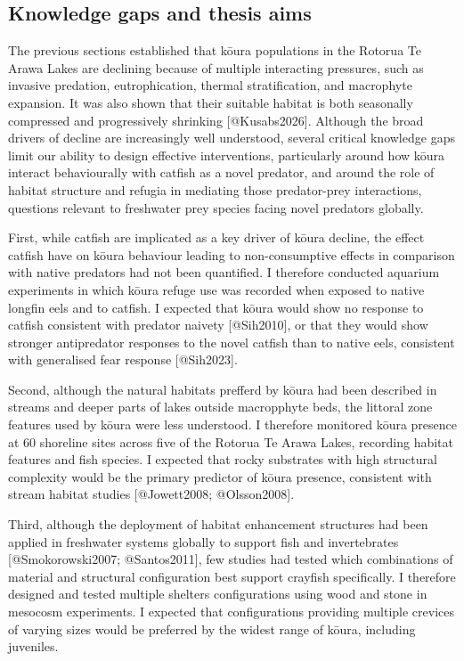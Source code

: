 \documentclass[
  letterpaper,
  DIV=11,
  numbers=noendperiod]{scrartcl}
\begin{document}
\subsection{Knowledge gaps and thesis
aims}\label{knowledge-gaps-and-thesis-aims}

The previous sections established that kōura populations in the Rotorua
Te Arawa Lakes are declining because of multiple interacting pressures,
such as invasive predation, eutrophication, thermal stratification, and
macrophyte expansion. It was also shown that their suitable habitat is
both seasonally compressed and progressively shrinking
{[}@Kusabs2026{]}. Although the broad drivers of decline are
increasingly well understood, several critical knowledge gaps limit our
ability to design effective interventions, particularly around how kōura
interact behaviourally with catfish as a novel predator, and around the
role of habitat structure and refugia in mediating those predator-prey
interactions, questions relevant to freshwater prey species facing novel
predators globally.

First, while catfish are implicated as a key driver of kōura decline,
the effect catfish have on kōura behaviour leading to non-consumptive
effects in comparison with native predators had not been quantified. I
therefore conducted aquarium experiments in which kōura refuge use was
recorded when exposed to native longfin eels and to catfish. I expected
that kōura would show no response to catfish consistent with predator
naivety {[}@Sih2010{]}, or that they would show stronger antipredator
responses to the novel catfish than to native eels, consistent with
generalised fear response {[}@Sih2023{]}.

Second, although the natural habitats prefferd by kōura had been
described in streams and deeper parts of lakes outside macropphyte beds,
the littoral zone features used by kōura were less understood. I
therefore monitored kōura presence at 60 shoreline sites across five of
the Rotorua Te Arawa Lakes, recording habitat features and fish species.
I expected that rocky substrates with high structural complexity would
be the primary predictor of kōura presence, consistent with stream
habitat studies {[}@Jowett2008; @Olsson2008{]}.

Third, although the deployment of habitat enhancement structures had
been applied in freshwater systems globally to support fish and
invertebrates {[}@Smokorowski2007; @Santos2011{]}, few studies had
tested which combinations of material and structural configuration best
support crayfish specifically. I therefore designed and tested multiple
shelters configurations using wood and stone in mesocosm experiments. I
expected that configurations providing multiple crevices of varying
sizes would be preferred by the widest range of kōura, including
juveniles.
\end{document}
